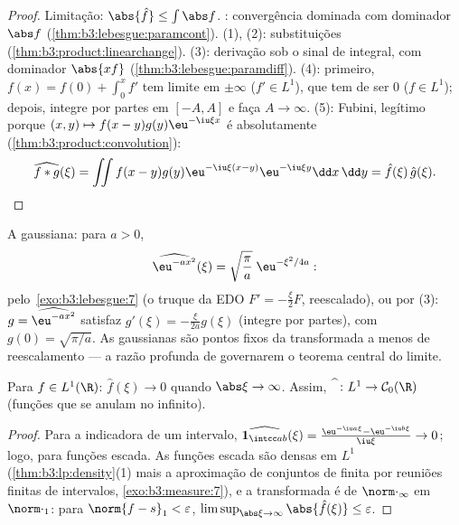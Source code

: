 \begin{proof}
Limitação: $\abs{\hat f} \leq \int\abs f$. : convergência dominada com dominador
$\abs f$ (\cref{thm:b3:lebesgue:paramcont}). (1), (2): substituições
(\cref{thm:b3:product:linearchange}). (3): derivação sob o sinal de integral, com dominador
$\abs{xf}$ (\cref{thm:b3:lebesgue:paramdiff}). (4): primeiro, $f(x) = f(0)
+ \int_0^xf'$ tem limite em $\pm\infty$ ($f' \in L^1$), que
tem de ser $0$ ($f \in L^1$); depois, integre por partes em $[-A,
A]$ e faça
$A \to \infty$. (5): Fubini, legítimo porque $(x,y)\mapsto f(x - y)g(y)\eu^{-\iu\xi x}$ é absolutamente 
(\cref{thm:b3:product:convolution}):
\[
\widehat{f*g}(\xi) = \iint f(x - y)g(y)\eu^{-\iu\xi(x - y)}
\eu^{-\iu\xi y}\dd x\,\dd y = \hat f(\xi)\,\hat g(\xi).
\]
\end{proof}

\begin{example}\label{ex:b3:fouriertransform:gaussian}
A gaussiana: para $a > 0$,
\[
\widehat{\eu^{-ax^2}}(\xi) =
\sqrt{\frac\pi a}\;\eu^{-\xi^2/4a} :
\]
pelo~\cref{exo:b3:lebesgue:7} (o truque da EDO $F' = -\frac\xi{2}F$, reescalado), ou por (3):
$g = \widehat{\eu^{-ax^2}}$ satisfaz $g'(\xi) = -\frac{\xi}{2a}g(\xi)$ (integre por partes), com $g(0) = \sqrt{\pi/a}$. As gaussianas são
pontos fixos da transformada a menos de reescalamento --- a razão
profunda de governarem o teorema central do limite.
\end{example}

\begin{theorem}
\label{thm:b3:fouriertransform:riemannlebesgue}
Para $f \in L^1(\R)$: $\hat f(\xi) \to 0$ quando $\abs\xi \to
\infty$. Assim, $\widehat{\phantom f} \colon L^1 \to \mathcal
C_0(\R)$ (funções  que se
anulam no infinito).
\end{theorem}

\begin{proof}
Para a indicadora de um intervalo, $\widehat{\mathbf 1_{\intcc
ab}}(\xi) = \frac{\eu^{-\iu a\xi} - \eu^{-\iu b\xi}}{\iu\xi}
\to 0$; logo, para funções escada. As
funções escada são densas em $L^1$ (\cref{thm:b3:lp:density}(1) mais a
aproximação de conjuntos de  finita por reuniões finitas de
intervalos, \cref{exo:b3:measure:7}), e a transformada é  de $\norm\cdot_\infty$ em
$\norm\cdot_1$: para $\norm{f -
s}_1 < \varepsilon$, $\limsup_{\abs\xi\to\infty}\abs{\hat
f(\xi)} \leq \varepsilon$.
\end{proof}


